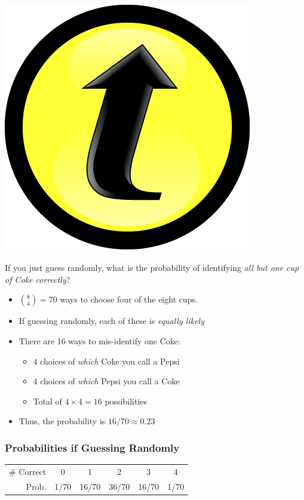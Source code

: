 \documentclass[handout]{beamer}
\begin{document}
\begin{frame}
\frametitle{\includegraphics[scale = 0.05]{./images/clicker}}
If you just guess randomly, what is the probability of identifying \emph{all but one cup of Coke correctly}?
\pause
\begin{itemize}
\item ${8\choose 4}=70$ ways to choose four of the eight cups. \pause
\item If guessing randomly, each of these is \emph{\alert{equally likely}} \pause
\item There are 16 ways to mis-identify one Coke: 
	\begin{itemize}
		\item $4$ choices of \emph{which} Coke you call a Pepsi 
		\item $4$ choices of \emph{which} Pepsi you call a Coke 
		\item Total of $4\times 4 = 16$ possibilities \pause
	\end{itemize}	
\item Thus, the probability is $16/70 \approx 0.23$
\end{itemize}
\end{frame}
\begin{frame}
\frametitle{Probabilities if Guessing Randomly}
	\begin{center}
		\begin{tabular}{rccccc}
		\hline
		\# Correct & 0 & 1 & 2 & 3 & 4\\
		Prob.&1/70 & 16/70 & 36/70 & 16/70 &1/70\\
		\hline
		\end{tabular}
	\end{center}
\end{frame}
\end{document}

